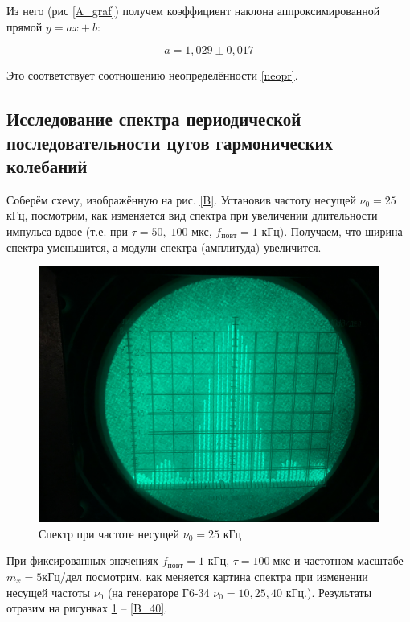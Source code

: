\documentclass[12pt]{kiarticle}
\begin{document}
  	
  	Из него (рис \ref{A_graf}) получем коэффициент наклона аппроксимированной прямой $ y = ax + b $:  
  	
  	\begin{equation}\label{}
  	a = 1,029 \pm 0,017 
  	\end{equation}
  	
  	Это соответствует соотношению неопределённости \eqref{neopr}. 
  	
  	\subsection{Исследование спектра периодической последовательности цугов гармонических колебаний}
  	
  	Соберём схему, изображённую на рис. \ref{B}. Установив частоту несущей $ \nu_0 = 25  $ кГц, посмотрим, как изменяется вид спектра при увеличении длительности импульса вдвое (т.е. при $ \tau = 50, \; 100 $ мкс, $ f_{повт} = 1 $ кГц). Получаем, что ширина спектра уменьшится, а модули спектра (амплитуда) увеличится. 
  	
  	 \begin{figure}[h]
  		\centering
  		\includegraphics[width=0.65\linewidth]{B_25.jpg}
  		\caption{Спектр при частоте несущей $ \nu_0 = 25 $ кГц}
  		\label{B_25}
  	\end{figure}
  	
  	При фиксированных значениях $  f_{повт} = 1 $ кГц, $ \tau= 100 \; мкс $ и частотном масштабе $ m_x = 5  $кГц/дел посмотрим, как меняется картина спектра при изменении несущей частоты $ \nu_0 $ (на генераторе Г6-34 $ \nu_0 = 10, 25, 40 $ кГц.). Результаты отразим на рисунках \ref{B_25} -- \ref{B_40}. 
  	
\end{document}
